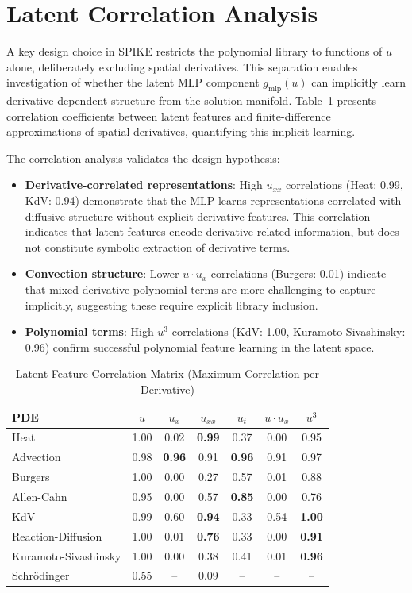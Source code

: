\documentclass{article}
\theoremstyle{remark}
\begin{document}
\FloatBarrier
\section{Latent Correlation Analysis}
\label{app:latent}

A key design choice in SPIKE restricts the polynomial library to functions of $u$ alone, deliberately excluding spatial derivatives. This separation enables investigation of whether the latent MLP component $g_{\text{mlp}}(u)$ can implicitly learn derivative-dependent structure from the solution manifold. Table~\ref{tab:latent_correlation} presents correlation coefficients between latent features and finite-difference approximations of spatial derivatives, quantifying this implicit learning.

The correlation analysis validates the design hypothesis:
\begin{itemize}
\item \textbf{Derivative-correlated representations}: High $u_{xx}$ correlations (Heat: 0.99, KdV: 0.94) demonstrate that the MLP learns representations correlated with diffusive structure without explicit derivative features. This correlation indicates that latent features encode derivative-related information, but does not constitute symbolic extraction of derivative terms.
\item \textbf{Convection structure}: Lower $u \cdot u_x$ correlations (Burgers: 0.01) indicate that mixed derivative-polynomial terms are more challenging to capture implicitly, suggesting these require explicit library inclusion.
\item \textbf{Polynomial terms}: High $u^3$ correlations (KdV: 1.00, Kuramoto-Sivashinsky: 0.96) confirm successful polynomial feature learning in the latent space.
\end{itemize}

\begin{table}[H]
\centering
\caption{Latent Feature Correlation Matrix (Maximum Correlation per Derivative)}
\label{tab:latent_correlation}
\begin{tabular}{lcccccc}
\toprule
PDE & $u$ & $u_x$ & $u_{xx}$ & $u_t$ & $u \cdot u_x$ & $u^3$ \\
\midrule
Heat & 1.00 & 0.02 & \textbf{0.99} & 0.37 & 0.00 & 0.95 \\
Advection & 0.98 & \textbf{0.96} & 0.91 & \textbf{0.96} & 0.91 & 0.97 \\
Burgers & 1.00 & 0.00 & 0.27 & 0.57 & 0.01 & 0.88 \\
Allen-Cahn & 0.95 & 0.00 & 0.57 & \textbf{0.85} & 0.00 & 0.76 \\
KdV & 0.99 & 0.60 & \textbf{0.94} & 0.33 & 0.54 & \textbf{1.00} \\
Reaction-Diffusion & 1.00 & 0.01 & \textbf{0.76} & 0.33 & 0.00 & \textbf{0.91} \\
Kuramoto-Sivashinsky & 1.00 & 0.00 & 0.38 & 0.41 & 0.01 & \textbf{0.96} \\
Schr\"odinger & 0.55 & -- & 0.09 & -- & -- & -- \\
\bottomrule
\end{tabular}
\end{table}
\end{document}
